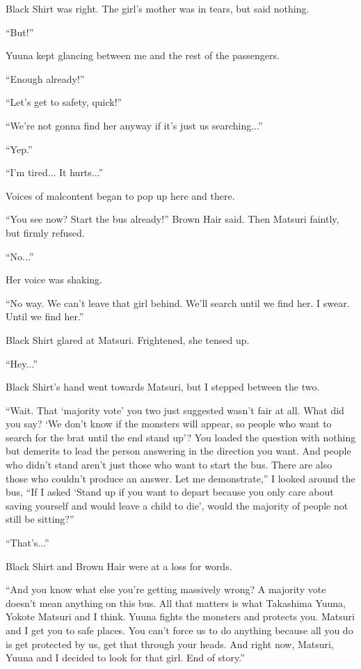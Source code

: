Black Shirt was right. The girl's mother was in tears, but said nothing.

``But!''

Yuuna kept glancing between me and the rest of the passengers.

``Enough already!''

``Let's get to safety, quick!''

``We're not gonna find her anyway if it's just us searching...''

``Yep.''

``I'm tired... It hurts...''

Voices of malcontent began to pop up here and there.

``You see now? Start the bus already!'' Brown Hair said. Then Matsuri faintly, but firmly refused.

``No...''

Her voice was shaking.

``No way. We can't leave that girl behind. We'll search until we find her. I swear. Until we find her.''

Black Shirt glared at Matsuri. Frightened, she tensed up.

``Hey...''

Black Shirt's hand went towards Matsuri, but I stepped between the two.

``Wait. That `majority vote' you two just suggested wasn't fair at all. What did you say? `We don't know if the monsters will appear, so people who want to search for the brat until the end stand up'? You loaded the question with nothing but demerits to lead the person answering in the direction you want. And people who didn't stand aren't just those who want to start the bus. There are also those who couldn't produce an answer. Let me demonstrate,'' I looked around the bus, ``If I asked `Stand up if you want to depart because you only care about saving yourself and would leave a child to die', would the majority of people not still be sitting?''

``That's...''

Black Shirt and Brown Hair were at a loss for words.

``And you know what else you're getting massively wrong? A majority vote doesn't mean anything on this bus. All that matters is what Takashima Yuuna, Yokote Matsuri and I think. Yuuna fights the monsters and protects you. Matsuri and I get you to safe places. You can't force us to do anything because all you do is get protected by us, get that through your heads. And right now, Matsuri, Yuuna and I decided to look for that girl. End of story.''

